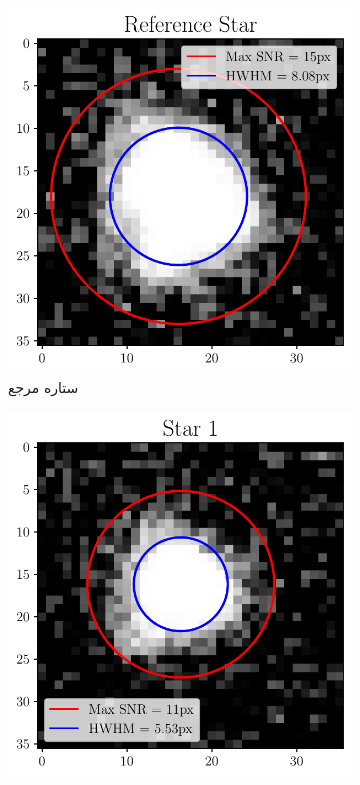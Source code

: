 \documentclass[12pt,a4paper]{article}
\begin{document}
	\begin{figure}[h!]
		\centering
		\begin{subfigure}{0.49\linewidth}
			\centering
			\includegraphics[width=\linewidth]{../fig/reference}
			\caption{ستاره مرجع}
		\end{subfigure}
		\begin{subfigure}{0.49\linewidth}
			\centering
			\includegraphics[width=\linewidth]{../fig/star1}

\end{subfigure}
\end{figure}
\end{document}
